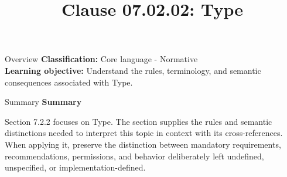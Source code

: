 \documentclass[10pt,letterpaper]{article}
\title{Clause 07.02.02: Type}
\author{}
\date{}
\begin{document}
\maketitle
\begin{CornellOverviewBox}{Overview}
\textbf{Classification:} Core language - Normative\\[2pt]
\textbf{Learning objective:} Understand the rules, terminology, and semantic consequences associated with Type.
\end{CornellOverviewBox}\begin{CornellSummaryBox}{Summary}
{\sffamily\bfseries\color{Accent} Summary}\par\vspace{3pt}Section 7.2.2 focuses on Type. The section supplies the rules and semantic distinctions needed to interpret this topic in context with its cross-references. When applying it, preserve the distinction between mandatory requirements, recommendations, permissions, and behavior deliberately left undefined, unspecified, or implementation-defined.
\end{CornellSummaryBox}
\end{document}
